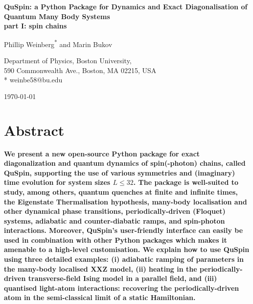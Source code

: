 \documentclass{SciPost}
\newcommand\0{\scalebox{-1}[1]{0}}
\begin{document}
\begin{center}{\Large \textbf{
QuSpin: a Python Package for Dynamics and Exact Diagonalisation of Quantum Many Body Systems\\
\large part I: spin chains
}}\end{center}

\begin{center}
Phillip Weinberg\textsuperscript{*} and Marin Bukov
\end{center}

\begin{center}
Department of Physics, Boston University, \\
590 Commonwealth Ave., Boston, MA 02215, USA
\\
* weinbe58@bu.edu
\end{center}

\begin{center}
\today
\end{center}


\section*{Abstract}
{\bf 
We present a new open-source Python package for exact diagonalization and quantum dynamics of spin(-photon) chains, called QuSpin, supporting the use of various symmetries and (imaginary) time evolution for system sizes $L \le 32$. The package is well-suited to study, among others, quantum quenches at finite and infinite times, the Eigenstate Thermalisation hypothesis, many-body localisation and other dynamical phase transitions, periodically-driven (Floquet) systems, adiabatic and counter-diabatic ramps, and spin-photon interactions. Moreover, QuSpin's user-friendly interface can easily be used in combination with other Python packages which makes it amenable to a high-level customisation. We explain how to use QuSpin using three detailed examples: (i) adiabatic ramping of parameters in the many-body localised XXZ model, (ii) heating in the periodically-driven transverse-field Ising model in a parallel field, and (iii) quantised light-atom interactions: recovering the periodically-driven atom in the semi-classical limit of a static Hamiltonian.
}
\end{document}
